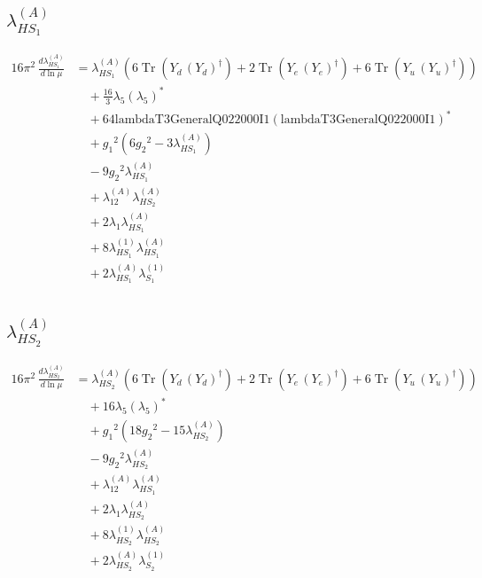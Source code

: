 \documentclass[10pt,a4paper]{article}
\begin{document}
\subsection*{$\lambda_{HS_1}^{(A)}$}
\begin{align*}
16\pi^2\,\frac{d \lambda_{HS_1}^{(A)}}{d\ln\mu} &={\lambda_{HS_1}^{(A)}} (6 \operatorname{Tr}\!\left({Y_d}\,\left({Y_d}\right)^{\dagger}\right)+2 \operatorname{Tr}\!\left({Y_e}\,\left({Y_e}\right)^{\dagger}\right)+6 \operatorname{Tr}\!\left({Y_u}\,\left({Y_u}\right)^{\dagger}\right)) \\
&\quad +\frac{16}{3} {\lambda_5} \left({\lambda_5}\right)^{*} \\
&\quad +64 \text{lambdaT3GeneralQ022000I1} \left(\text{lambdaT3GeneralQ022000I1}\right)^{*} \\
&\quad +{g_1}^2 \left(6 {g_2}^2-3 {\lambda_{HS_1}^{(A)}}\right) \\
&\quad -9 {g_2}^2 {\lambda_{HS_1}^{(A)}} \\
&\quad +{\lambda_{12}^{(A)}} {\lambda_{HS_2}^{(A)}} \\
&\quad +2 {\lambda_1} {\lambda_{HS_1}^{(A)}} \\
&\quad +8 {\lambda_{HS_1}^{(1)}} {\lambda_{HS_1}^{(A)}} \\
&\quad +2 {\lambda_{HS_1}^{(A)}} {\lambda_{S_1}^{(1)}} \\
\end{align*}
\subsection*{$\lambda_{HS_2}^{(A)}$}
\begin{align*}
16\pi^2\,\frac{d \lambda_{HS_2}^{(A)}}{d\ln\mu} &={\lambda_{HS_2}^{(A)}} (6 \operatorname{Tr}\!\left({Y_d}\,\left({Y_d}\right)^{\dagger}\right)+2 \operatorname{Tr}\!\left({Y_e}\,\left({Y_e}\right)^{\dagger}\right)+6 \operatorname{Tr}\!\left({Y_u}\,\left({Y_u}\right)^{\dagger}\right)) \\
&\quad +16 {\lambda_5} \left({\lambda_5}\right)^{*} \\
&\quad +{g_1}^2 \left(18 {g_2}^2-15 {\lambda_{HS_2}^{(A)}}\right) \\
&\quad -9 {g_2}^2 {\lambda_{HS_2}^{(A)}} \\
&\quad +{\lambda_{12}^{(A)}} {\lambda_{HS_1}^{(A)}} \\
&\quad +2 {\lambda_1} {\lambda_{HS_2}^{(A)}} \\
&\quad +8 {\lambda_{HS_2}^{(1)}} {\lambda_{HS_2}^{(A)}} \\
&\quad +2 {\lambda_{HS_2}^{(A)}} {\lambda_{S_2}^{(1)}} \\
\end{align*}
\end{document}
